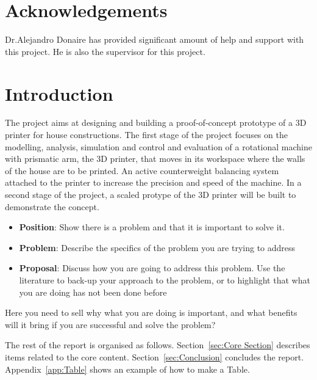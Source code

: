 \documentclass{UoNMCHA}
\numberwithin{equation}{section}
\begin{document}
\vspace{-2mm}
\section*{Acknowledgements}
\vspace{-3mm}
Dr.Alejandro Donaire has provided significant amount of help and support with this project. He is also the supervisor for this project.
\newpage
\tableofcontents
\listoffigures
\newpage
\section{Introduction}
The project aims at designing and building a proof-of-concept prototype of a 3D printer for house constructions. The first stage of the project focuses on the modelling, analysis, simulation and control and evaluation of a rotational machine with prismatic arm, the 3D printer, that moves in its workspace where the walls of the house are to be printed. An active counterweight balancing system attached to the printer to increase the precision and speed of the machine. In a second stage of the project, a scaled protype of the 3D printer will be built to demonstrate the concept.
\begin{itemize}
    \item \textbf{Position}: Show there is a problem and that it is important to solve it.
    \item \textbf{Problem}: Describe the specifics of the problem you are trying to address
    \item \textbf{Proposal}: Discuss how you are going to address this problem. Use the literature to back-up your approach to the problem, or to highlight that what you are doing has not been done before
\end{itemize}
Here you need to sell why what you are doing is important, and what benefits will it bring if you are successful and solve the problem? 
%

The rest of the report is organised as follows. Section~\ref{sec:Core Section} describes items related to the core content. Section~\ref{sec:Conclusion} concludes the report. Appendix~\ref{app:Table} shows an example of how to make a Table.
\newpage
\end{document}
